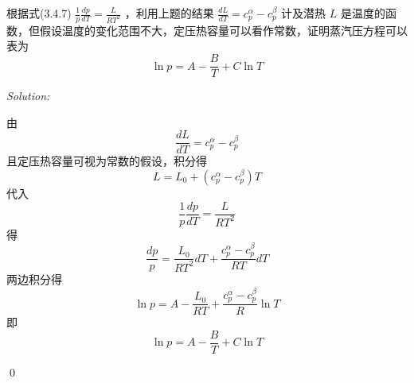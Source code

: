 \documentclass[12pt,a4paper]{article}
\newenvironment{problem}[2][Problem]{\begin{trivlist}
\item[\hskip \labelsep {\bfseries #1}\hskip \labelsep {\bfseries #2.}]}{\end{trivlist}}
\newenvironment{sol}
    {\emph{Solution:}
    }
    {
    \qed
    }
\begin{document}
\begin{problem}{3.11}
根据式(3.4.7) $\frac{1}{p}\frac{dp}{dT}=\frac{L}{RT^2}$ ，利用上题的结果 $\frac{dL}{dT}=c_p^{\alpha}-c_p^{\beta}$ 计及潜热 $L$ 是温度的函数，但假设温度的变化范围不大，定压热容量可以看作常数，证明蒸汽压方程可以表为
\[
\ln p=A-\frac{B}{T}+C\ln T
\]
\end{problem}
\begin{sol}
由
\begin{equation}
\frac{dL}{dT}=c_p^{\alpha}-c_p^{\beta}
\end{equation}
且定压热容量可视为常数的假设，积分得
\begin{equation}
L=L_0+(c_p^{\alpha}-c_p^{\beta})T
\end{equation}
代入
\begin{equation}
\frac{1}{p}\frac{dp}{dT}=\frac{L}{RT^2}
\end{equation}
得
\begin{equation}
\frac{dp}{p}=\frac{L_0}{RT^2}dT+\frac{c_p^{\alpha}-c_p^{\beta}}{RT}dT
\end{equation}
两边积分得
\begin{equation}
\ln p=A-\frac{L_0}{RT}+\frac{c_p^{\alpha}-c_p^{\beta}}{R}\ln T
\end{equation}
即
\begin{equation}
\ln p=A-\frac{B}{T}+C\ln T
\end{equation}
\end{sol}
\end{document}
